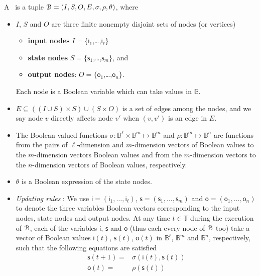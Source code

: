 \begin{definition} 
\label{def:BCN}
A \BCN\ is a tuple ${\mathcal{B}} = (I,S,O, E, \sigma, \rho, \theta)$, where 
\begin{itemize}
\item $I$, $S$ and $O$ are three finite nonempty disjoint sets of nodes (or vertices)
\begin{itemize}
	\item {\bf input nodes} $I=\{\mathsf{i}_1$,\ldots ,$\mathsf{i}_{\ell}\}$
	\item {\bf state nodes}  $S= \{\mathsf{s}_1$,\ldots ,$\mathsf{s}_m\}$, and 
	\item {\bf output nodes}: $O= \{\mathsf{o}_1$,\ldots ,$\mathsf{o}_n\}$.
	\end{itemize}	
	Each node is a Boolean variable which can take values in $\mathbb{B}$.
\item  $E \subseteq ((I\cup S)\times S)\cup (S\times O)$ is a set of edges among the nodes, and we say node $v$ directly affects node  $v'$  when $(v,v')$ is an edge in $E$.
\item The Boolean valued functions $\sigma: \mathbb{B}^\ell\times  \mathbb{B}^m \mapsto \mathbb{B}^m$ and $\rho: \mathbb{B}^m\mapsto \mathbb{B}^n$ are functions from the pairs of $\ell$-dimension and $m$-dimension vectors  of Boolean values to  the $m$-dimension vectors Boolean values and from the  $m$-dimension vectors to the  $n$-dimension vectors  of Boolean values, respectively. 
\item $\theta$ is a Boolean expression of the state nodes.
\item {\em Updating rules }:  We use 
 $\mathsf{i}= (\mathsf{i}_1,\ldots, \mathsf{i}_\ell)$, $\mathsf{s}= (\mathsf{s}_1,\ldots, \mathsf{s}_m)$ and $\mathsf{o}= (\mathsf{o}_1,\ldots, \mathsf{o}_n)$ to denote the three variables Boolean vectors corresponding  to the input nodes, state nodes and output nodes. At any time $t\in \mathbb{T}$ during the execution 
 of ${\mathcal{B}}$, each of the variables  $\mathsf{i}$, $\mathsf{s}$ and $\mathsf{o}$  (thus each every node of ${\mathcal{B}}$ too) take a vector of Boolean values $\mathsf{i}(t)$, $\mathsf{s}(t)$, $\mathsf{o}(t)$  in  $\mathbb{B}^\ell$, $\mathbb{B}^m$ and $\mathbb{B}^n$, respectively, such that the following equations are satisfied
\begin{equation}
\begin{split}
\mathsf{s}(t+1)=&\sigma(\mathsf{i}(t),\mathsf{s}(t))\\
\mathsf{o}(t)=&\rho(\mathsf{s}(t))
\end{split}

\end{equation}
\end{itemize}
\end{definition}
